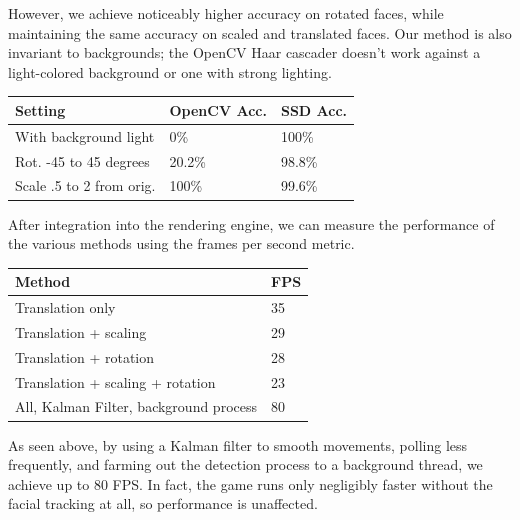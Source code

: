 \documentclass[10pt,twocolumn,letterpaper]{article}
\begin{document}
However, we achieve noticeably higher accuracy on rotated faces, while maintaining the same accuracy on scaled and translated faces. Our method is also invariant to backgrounds; the OpenCV Haar cascader doesn't work against a light-colored background or one with strong lighting.

\begin{center}
    \begin{tabular}{| l | l | l |}
    \hline
    \textbf{Setting}                     & \textbf{OpenCV Acc.} & \textbf{SSD Acc.}          \\ \hline
     With background light                  & 0\%       & 100\%       \\ \hline 
     Rot. -45 to 45 degrees           &  20.2\%  & 98.8\%      \\ \hline
     Scale .5 to 2 from orig. & 100\%    & 99.6\%                 \\  \hline
\end{tabular}
\end{center}

After integration into the rendering engine, we can measure the performance of the various methods using the frames per second metric.

\begin{center}
    \begin{tabular}{| l | l |}
    \hline
     \textbf{Method}                                                 & \textbf{FPS}       \\ \hline
     Translation only                                    & 35           \\ \hline 
     Translation + scaling                             &  29           \\ \hline      
    Translation + rotation                            & 28             \\ \hline           
    Translation + scaling + rotation              & 23             \\  \hline
    All, Kalman Filter, background process    & 80             \\   \hline
\end{tabular}
\end{center}

As seen above, by using a Kalman filter to smooth movements, polling less frequently, and farming out the detection process to a background thread, we achieve up to 80 FPS. In fact, the game runs only negligibly faster without the facial tracking at all, so performance is unaffected.
\end{document}

